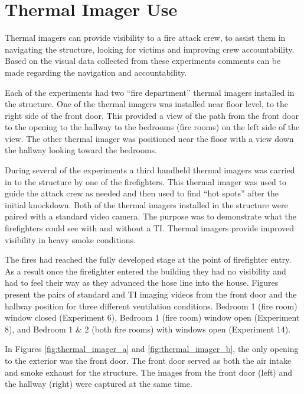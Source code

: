 \documentclass[12pt,oneside]{book}
\begin{document}
\section{Thermal Imager Use} \label{tc:thermal_imagers}
Thermal imagers can provide visibility to a fire attack crew, to assist them in navigating the structure, looking for victims and improving crew accountability.  Based on the visual data collected from these experiments comments can be made regarding the navigation and accountability.   

Each of the experiments had two “fire department” thermal imagers installed in the structure.  One of the thermal imagers was installed near floor level, to the right side of the front door.  This provided a view of the path from the front door to the opening to the hallway to the bedrooms (fire rooms) on the left side of the view.  The other thermal imager was positioned near the floor with a view down the hallway looking toward the bedrooms.  

During several of the experiments a third handheld thermal imagers was carried in to the structure by one of the firefighters.  This thermal imager was used to guide the attack crew as needed and then used to find “hot spots” after the initial knockdown.  
Both of the thermal imagers installed in the structure were paired with a standard video camera.  The purpose was to demonstrate what the firefighters could see with and without a TI.  
Thermal imagers provide improved visibility in heavy smoke conditions.

The fires had reached the fully developed stage at the point of firefighter entry.  As a result once the firefighter entered the building they had no visibility and had to feel their way as they advanced the hose line into the house.   Figures present the pairs of standard and TI imaging videos from the front door and the hallway position for three different ventilation conditions.  Bedroom 1 (fire room) window closed (Experiment 6), Bedroom 1 (fire room) window open (Experiment 8), and Bedroom 1 \& 2 (both fire rooms) with windows open (Experiment 14).  

In Figures \ref{fig:thermal_imager_a} and \ref{fig:thermal_imager_b}, the only opening to the exterior was the front door.  The front door served as both the air intake and smoke exhaust for the structure.  The images from the front door (left) and the hallway (right) were captured at the same time.    
\end{document}
